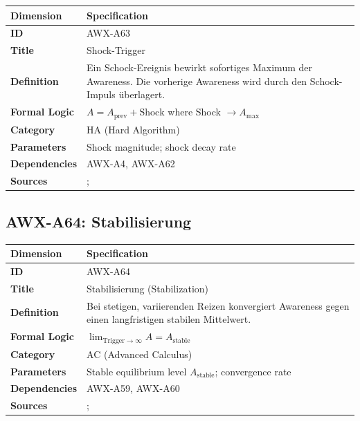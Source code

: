 \begin{table}[htbp]
\small
\begin{tabular}{p{3cm}p{11cm}}
\toprule
\textbf{Dimension} & \textbf{Specification} \\
\midrule
\textbf{ID} & AWX-A63 \\
\textbf{Title} & Shock-Trigger \\
\textbf{Definition} & Ein Schock-Ereignis bewirkt sofortiges Maximum der Awareness. Die vorherige Awareness wird durch den Schock-Impuls überlagert. \\
\textbf{Formal Logic} & $A = A_{\text{prev}} + \text{Shock}$ where Shock $\rightarrow A_{\text{max}}$ \\
\textbf{Category} & HA (Hard Algorithm) \\
\textbf{Parameters} & Shock magnitude; shock decay rate \\
\textbf{Dependencies} & AWX-A4, AWX-A62 \\
\textbf{Sources} & \citet{loewenstein2001risk}; \citet{slovic2004risk} \\
\bottomrule
\end{tabular}
\end{table}


\subsection{AWX-A64: Stabilisierung}

\begin{table}[htbp]
\small
\begin{tabular}{p{3cm}p{11cm}}
\toprule
\textbf{Dimension} & \textbf{Specification} \\
\midrule
\textbf{ID} & AWX-A64 \\
\textbf{Title} & Stabilisierung (Stabilization) \\
\textbf{Definition} & Bei stetigen, variierenden Reizen konvergiert Awareness gegen einen langfristigen stabilen Mittelwert. \\
\textbf{Formal Logic} & $\lim_{\text{Trigger} \rightarrow \infty} A = A_{\text{stable}}$ \\
\textbf{Category} & AC (Advanced Calculus) \\
\textbf{Parameters} & Stable equilibrium level $A_{\text{stable}}$; convergence rate \\
\textbf{Dependencies} & AWX-A59, AWX-A60 \\
\textbf{Sources} & \citet{helson1964adaptation}; \citet{frederick1999hedonic} \\
\bottomrule
\end{tabular}
\end{table}

